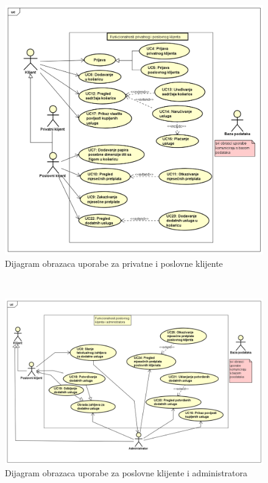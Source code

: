 \begin{center}
						\noindent \normalsize{   } \\
						\begin{figure}[H]
							\includegraphics[scale=0.6]{dijagrami/privatni_poslovni.PNG} 
							\centering
							\caption{Dijagram obrazaca uporabe za privatne i poslovne klijente}
							\label{fig:obr_up2}%
						\end{figure}
						\noindent \normalsize{   } \\
						\begin{figure}[H]
							\includegraphics[scale=0.5]{dijagrami/poslovni_admin.PNG} 
							\centering
							\caption{Dijagram obrazaca uporabe za poslovne klijente i administratora}
							\label{fig:obr_up3}%
						\end{figure}
						
					\end{center}
					
